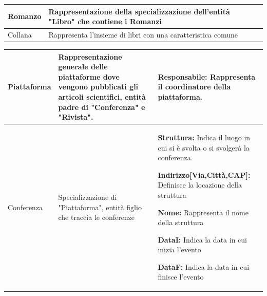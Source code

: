 \begin{center}
\begin{tabular}{ | m{5cm} | m{5cm}| m{6cm} | }
        
            Romanzo & Rappresentazione della specializzazione dell'entità "Libro" che contiene i Romanzi & \\ 
        \hline
            Collana & Rappresenta l'insieme di libri con una caratteristica comune & \\ 
        \hline

      \end{tabular}
          \begin{tabular}{ | m{5cm} | m{5cm}| m{6cm} | }  
        \hline


            Piattaforma & Rappresentazione generale delle piattaforme dove vengono  pubblicati gli articoli scientifici, entità padre di "Conferenza" e "Rivista". 
            & {\bf Responsabile:} Rappresenta il coordinatore della piattaforma.\par \\ 
        \hline

        
            Conferenza & Specializzazione di "Piattaforma", entità figlio che traccia le conferenze
            & {\bf Struttura:} Indica il luogo in cui si è svolta o si svolgerà la conferenza.\par
              {\bf  Indirizzo{\large[Via,Città,CAP]:}}  Definisce la locazione della struttura\par
              {\bf Nome:} Rappresenta il nome della struttura\par
              {\bf DataI:} Indica la data in cui inizia l'evento\par
              {\bf DataF:} Indica la data in cui finisce l'evento\par
              \\ 
              \hline
              
      


\end{tabular}
\end{center}

